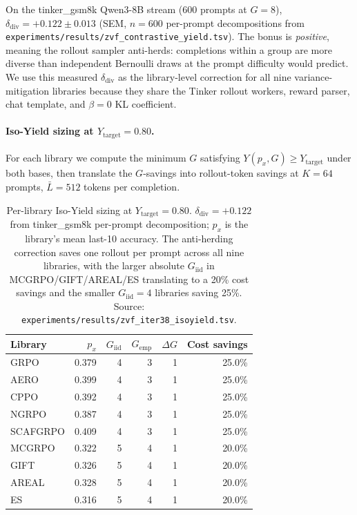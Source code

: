 \documentclass{article}
\begin{document}
On the tinker\_gsm8k Qwen3-8B stream (600 prompts at $G{=}8$),
$\delta_{\mathrm{div}} = +0.122 \pm 0.013$ (SEM, $n{=}600$ per-prompt
decompositions from
\texttt{experiments/results/zvf_contrastive_yield.tsv}). The bonus is
\emph{positive}, meaning the rollout sampler anti-herds: completions
within a group are more diverse than independent Bernoulli draws at the
prompt difficulty would predict. We use this measured $\delta_{\mathrm{div}}$
as the library-level correction for all nine variance-mitigation
libraries because they share the Tinker rollout workers, reward parser,
chat template, and $\beta{=}0$ KL coefficient.

\paragraph{Iso-Yield sizing at $Y_{\mathrm{target}}{=}0.80$.}
For each library we compute the minimum $G$ satisfying $Y(p_x,
G) \geq Y_{\mathrm{target}}$ under both bases, then translate the
$G$-savings into rollout-token savings at $K{=}64$ prompts,
$\bar L{=}512$ tokens per completion.

\begin{table}[htbp]
\centering\small
\setlength{\tabcolsep}{4pt}
\begin{tabular}{lrrrrr}
\hline
Library  & $p_x$ & $G_{\mathrm{iid}}$ & $G_{\mathrm{emp}}$ & $\Delta G$ & Cost savings \\
\hline
GRPO        & 0.379 & 4 & 3 & 1 & 25.0\% \\
AERO        & 0.399 & 4 & 3 & 1 & 25.0\% \\
CPPO        & 0.392 & 4 & 3 & 1 & 25.0\% \\
NGRPO       & 0.387 & 4 & 3 & 1 & 25.0\% \\
SCAFGRPO    & 0.409 & 4 & 3 & 1 & 25.0\% \\
MCGRPO      & 0.322 & 5 & 4 & 1 & 20.0\% \\
GIFT        & 0.326 & 5 & 4 & 1 & 20.0\% \\
AREAL       & 0.328 & 5 & 4 & 1 & 20.0\% \\
ES          & 0.316 & 5 & 4 & 1 & 20.0\% \\
\hline
\end{tabular}
\caption{Per-library Iso-Yield sizing at $Y_{\mathrm{target}}{=}0.80$.
$\delta_{\mathrm{div}}{=}+0.122$ from tinker\_gsm8k per-prompt
decomposition; $p_x$ is the library's mean last-10 accuracy. The
anti-herding correction saves one rollout per prompt across all nine
libraries, with the larger absolute $G_{\mathrm{iid}}$ in
MCGRPO/GIFT/AREAL/ES translating to a 20\% cost savings and the smaller
$G_{\mathrm{iid}}{=}4$ libraries saving 25\%. Source:
\texttt{experiments/results/zvf_iter38_isoyield.tsv}.}
\label{tab:zvf-isoyield-y80}
\end{table}
\end{document}
